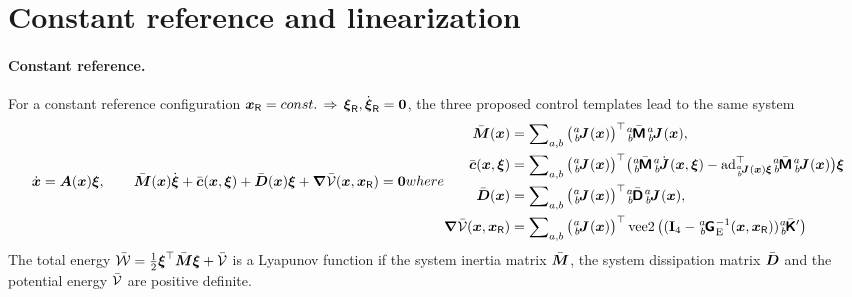 \section{Constant reference and linearization}\label{sec:CtrlLinearization}
\paragraph{Constant reference.}
For a constant reference configuration $\boldsymbol{x}_{\mathsf{R}} = const. \, \Rightarrow \, \boldsymbol{\xi}_{\mathsf{R}}, \dot{\boldsymbol{\xi}}_{\mathsf{R}} = \boldsymbol{0}$, the three proposed control templates lead to the same system
\begin{subequations}
\label{eq:ClosedLoopStab}
\begin{align}
 \sysCoordd = \kinMat(\sysCoord) \sysVel,
\qquad
 \sysInertiaMatC(\sysCoord) \sysVeld + \gyroForceC(\sysCoord, \sysVel) + \sysDissMatC(\sysCoord)\sysVel + \differential \potentialEnergyC(\sysCoord, \sysCoordR) = \tuple{0}
\end{align}
where
\begin{align}
 \sysInertiaMatC(\sysCoord) &= \sumBodiesAB \big(\bodyJac{\BidxI}{\BidxII}(\sysCoord)\big)^\top \bodyInertiaMatC{\BidxI}{\BidxII} \bodyJac{\BidxI}{\BidxII}(\sysCoord),
\\
 \gyroForceC(\sysCoord, \sysVel) &= \sumBodiesAB \big(\bodyJac{\BidxI}{\BidxII}(\sysCoord)\big)^\top \big(\bodyInertiaMatC{\BidxI}{\BidxII} \bodyJacd{\BidxI}{\BidxII}(\sysCoord, \sysVel) - \ad{\bodyJac{\BidxI}{\BidxII}(\sysCoord)\sysVel}^\top \bodyInertiaMatC{\BidxI}{\BidxII}\bodyJac{\BidxI}{\BidxII}(\sysCoord) \big) \sysVel
\\
 \sysDissMatC(\sysCoord) &= \sumBodiesAB \big(\bodyJac{\BidxI}{\BidxII}(\sysCoord)\big)^\top \bodyDissMatC{\BidxI}{\BidxII} \bodyJac{\BidxI}{\BidxII}(\sysCoord),
\\
 \differential \potentialEnergyC(\sysCoord, \sysCoordR) &= \sumBodiesAB \big(\bodyJac{\BidxI}{\BidxII}(\sysCoord)\big)^\top \veeTwoOp \big( (\idMat[4] - \bodyHomoCoordE{\BidxI}{\BidxII}^{-1}(\sysCoord,\sysCoordR)) \bodyStiffMatCp{\BidxI}{\BidxII} \big)
\end{align} 
\end{subequations}
The total energy $\bar{\mathcal{W}} = \tfrac{1}{2} \boldsymbol{\xi}^\top \bar{\boldsymbol{M}} \boldsymbol{\xi} + \bar{\mathcal{V}}$ is a Lyapunov function if the system inertia matrix $\bar{\boldsymbol{M}}$, the system dissipation matrix $\bar{\boldsymbol{D}}$ and the potential energy $\bar{\mathcal{V}}$ are positive definite. 

